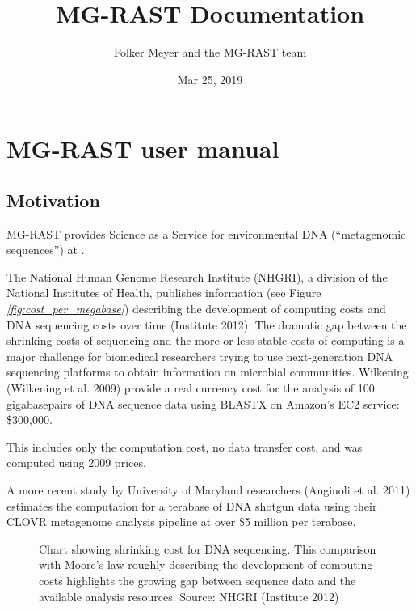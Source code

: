\documentclass[letterpaper,10pt,english]{sphinxmanual}
\title{MG-RAST Documentation}
\date{Mar 25, 2019}
\author{Folker Meyer and the MG-RAST team}
\begin{document}
\pagestyle{empty}
\sphinxmaketitle
\pagestyle{plain}
\sphinxtableofcontents
\pagestyle{normal}
\label{\detokenize{index::doc}}



\chapter{MG-RAST user manual}
\label{\detokenize{user_manual:mg-rast-user-manual}}\label{\detokenize{user_manual::doc}}

\section{Motivation}
\label{\detokenize{user_manual:motivation}}
MG-RAST provides Science as a Service for environmental DNA
(“metagenomic sequences”) at .

The National Human Genome Research Institute (NHGRI), a division of the
National Institutes of Health, publishes information (see Figure
{\hyperref[\detokenize{user_manual:fig:cost_per_megabase}]{\emph{{[}fig:cost\_per\_megabase{]}}}}) describing the
development of computing costs and DNA sequencing costs over time
(Institute 2012). The dramatic gap between the shrinking costs of
sequencing and the more or less stable costs of computing is a major
challenge for biomedical researchers trying to use next-generation DNA
sequencing platforms to obtain information on microbial communities.
Wilkening  (Wilkening et al. 2009) provide a real currency cost
for the analysis of 100 gigabasepairs of DNA sequence data using BLASTX
on Amazon’s EC2 service: \$300,000. %
\begin{footnote}[1]\sphinxAtStartFootnote
This includes only the computation cost, no data transfer cost, and
was computed using 2009 prices.
%
\end{footnote} A more recent study by
University of Maryland researchers (Angiuoli et al. 2011) estimates the
computation for a terabase of DNA shotgun data using their CLOVR
metagenome analysis pipeline at over \$5 million per terabase.

\begin{figure}[htbp]
\centering
\capstart

\noindent{}
\caption{Chart showing shrinking cost for DNA sequencing. This comparison with
Moore’s law roughly describing the development of computing costs
highlights the growing gap between sequence data and the available
analysis resources. Source: NHGRI (Institute 2012)}\label{\detokenize{user_manual:id12}}\end{figure}
\end{document}
